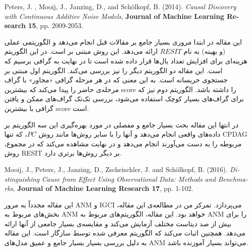\documentclass{article}
\begin{document}
\begin{enumerate}
\begin{latin}
Peters, J. , Mooij, J., Janzing, D., and Sch{\"o}lkopf, B.  (2014).
\textit{Causal Discovery with Continuous Additive Noise Models}, \textbf{Journal of Machine Learning Research 15}, pp. 2009-2053.
\end{latin}
این مقاله در ابتدا مروری بسیار جامع بر مقالات قبل انجام می‌دهد و الگوریتمی عملی (و بهینه) به نام  $RESIT$ ارائه می‌دهد. این روش مبتنی بر 
 است. در این الگوریتم هزینه‌ای برای افزایش تعداد یال‌ها قرار داده شده است تا در نهایت به گرافی برسیم که 
است. 
این مقاله دو  الگوریتم دیگر را نیز بررسی می‌کند. الگوریتم اول مبتنی بر جستجوی حریسانه است. به این معنی که در هر مرحله گرافی «مجاور» با گراف مرحله‌ی حاضر را پیدا می‌کند که بیشترین score را داشته باشد. الگوریتم دوم نیز که برای گراف‌های بسیار کوچک استفاده می‌شود، بررسی تک‌تک گراف‌های ممکن و یافتن گرافی با بیشترین score است.

در انتها این مقاله بحث بسیار جامع و مفصلی در مورد بهره‌گیری این سه الگوریتم بر داده‌های واقعی انجام می‌دهد و آنها را با سایر روش‌ها مانند روش $PC$، که تنها CPDAG مربوطه را به دست می‌آورند انجام می‌دهد و در نهایت مشاهده می‌کند که در مجموع، روش RESIT بر دیگر روش‌ها برتری دارد.

\begin{latin}
	Mooij, J., Peters, J.,  Janzing, D., Zscheischler, J. and Sch{\"o}lkopf, B.  (2016).
	\textit{Distinguishing Cause from Effect Using Observational Data:
		Methods and Benchmarks}, \textbf{Journal of Machine Learning Research 17}, pp. 1-102.
\end{latin}
این مقاله مجدداً به مرور ANM و IGCI می‌پردازد. تمرکز من در مطالعه‌ی این مقاله، بخش‌های مربوط به ANM خواهد بود. این مقاله،‌ الگوریتم‌های مربوط به ANM را برای بیش از صد دیتاست مختلف آزمایش می‌کند و مقایسه‌ی بسیار جامعی از آنها ارائه می‌دهد.  همچنین اثبات می‌کند که الگوریتم معرفی شده توسط 
سازگار است. این مقاله به دلیل بررسی بسیار بسیار جامع و عمیق مدل‌های ANM می‌تواند بسیار آموزنده باشد.
\end{enumerate}
\end{document}
